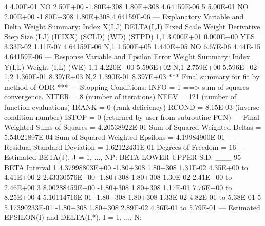 {{           4  4.00E-01       NO  2.50E+00 -1.80E+308  1.80E+308   4.64159E-06
           5  5.00E-01       NO  2.00E+00 -1.80E+308  1.80E+308   4.64159E-06
\phantom{blank line}
 --- Explanatory Variable and Delta Weight Summary:
\phantom{blank line}
       Index      X(I,J)  DELTA(I,J)    Fixed     Scale    Weight    Derivative
                                                                      Step Size
       (I,J)                          (IFIXX)    (SCLD)      (WD)        (STPD)
\phantom{blank line}
         1,1   3.000E+01   0.000E+00      YES  3.33E-02  1.11E-07   4.64159E-06
         N,1   1.500E+05   1.440E+05       NO  6.67E-06  4.44E-15   4.64159E-06
\phantom{blank line}
 --- Response Variable and Epsilon Error Weight Summary:
\phantom{blank line}
       Index      Y(I,L)      Weight
       (I,L)                    (WE)
\phantom{blank line}
         1,1   4.220E+00   5.596E+02
         N,1   2.759E+00   5.596E+02
\phantom{blank line}
         1,2   1.360E-01   8.397E+03
         N,2   1.390E-01   8.397E+03
\phantom{blank line}
 *** Final summary for fit by method of ODR ***
\phantom{blank line}
 --- Stopping Conditions:
         INFO =     1 ==> sum of squares convergence.
        NITER =     8          (number of iterations)
         NFEV =   121          (number of function evaluations)
        IRANK =     0          (rank deficiency)
        RCOND =     8.15E-03   (inverse condition number)
        ISTOP =     0          (returned by user from subroutine FCN)
\phantom{blank line}
 --- Final Weighted Sums of Squares       =                     4.20538922E-01
         Sum of Squared Weighted Deltas   =    5.54021897E-04
         Sum of Squared Weighted Epsilons =    4.19984900E-01
\phantom{blank line}
 --- Residual Standard Deviation          =                     1.62122431E-01
         Degrees of Freedom               =   16
\phantom{blank line}
 --- Estimated BETA(J), J = 1, ..., NP:
\phantom{blank line}
                     BETA      LOWER     UPPER      S.D.  ___ 95%
                                                    BETA         Interval
\phantom{blank line}
       1   4.37998803E+00  -1.80+308  1.80+308  1.31E-02   4.35E+00 to  4.41E+00
       2   2.43330576E+00  -1.80+308  1.80+308  1.30E-02   2.41E+00 to  2.46E+00
       3   8.00288459E+00  -1.80+308  1.80+308  1.17E-01   7.76E+00 to  8.25E+00
       4   5.10114716E-01  -1.80+308  1.80+308  1.33E-02   4.82E-01 to  5.38E-01
       5   5.17390233E-01  -1.80+308  1.80+308  2.89E-02   4.56E-01 to  5.79E-01
\phantom{blank line}
 --- Estimated EPSILON(I) and DELTA(I,*), I = 1, ..., N:
}}
